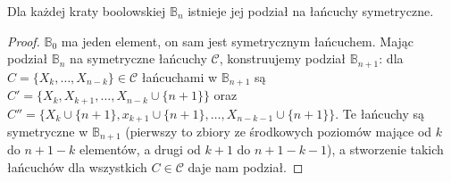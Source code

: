 \begin{theorem}
	Dla każdej kraty boolowskiej \(\mathbb B_n\) istnieje jej podział na łańcuchy symetryczne.
\end{theorem}
\begin{proof}
	\(\mathbb B_0\) ma jeden element, on sam jest symetrycznym łańcuchem. Mając
	podział \(\mathbb B_n\) na symetryczne łańcuchy \(\mathcal C\), konstruujemy
	podział \(\mathbb B_{n+1}\): dla \(C = \{X_k,\ldots, X_{n-k}\}\in\mathcal C\)
	łańcuchami w \(\mathbb B_{n+1}\) są \(C' = \{X_k,X_{k+1},\ldots,
	X_{n-k}\cup\{n+1\}\}\) oraz \(C'' = \{X_k\cup\{n+1\},
	x_{k+1}\cup\{n+1\},\ldots, X_{n-k-1}\cup\{n+1\}\}\). Te łańcuchy są symetryczne
	w \(\mathbb B_{n+1}\) (pierwszy to zbiory ze środkowych poziomów mające od \(k\)
	do \(n+1-k\) elementów, a drugi od \(k+1\) do \(n+1-k-1\)), a stworzenie takich
	łańcuchów dla wszystkich \(C\in\mathcal C\) daje nam podział.
\end{proof}

